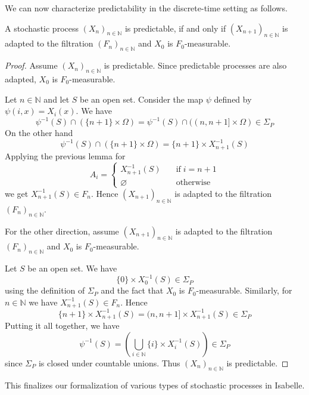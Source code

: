 We can now characterize predictability in the discrete-time setting as follows.
\begin{theorem}
	A stochastic process $(X_n)_{n \in \mathbb{N}}$ is predictable, if and only if $(X_{n + 1})_{n \in \mathbb{N}}$ is adapted to the filtration $(F_n)_{n \in \mathbb{N}}$ and $X_0$ is $F_0$-measurable.
\end{theorem}
\begin{proof}
	Assume $(X_n)_{n \in \mathbb{N}}$ is predictable. Since predictable processes are also adapted, $X_0$ is $F_0$-measurable.
	
	Let $n \in \mathbb{N}$ and let $S$ be an open set. Consider the map $\psi$ defined by $\psi(i,x) = X_i(x)$. We have
	\[
		\psi^{-1}(S) \cap (\{n + 1\} \times \Omega) = \psi^{-1}(S) \cap ((n, n + 1] \times \Omega) \in \Sigma_P
	\]
	On the other hand
	\[
		\psi^{-1}(S) \cap (\{n + 1\} \times \Omega) = \{n + 1\} \times X_{n + 1}^{-1}(S)
	\]
	Applying the previous lemma for 
	\[
		A_i = 
		\begin{cases}
			X_{n + 1}^{-1}(S) &\quad \textrm{if} \; i = n + 1 \\
			\varnothing &\quad \textrm{otherwise}
		\end{cases}
	\]
	we get $X_{n + 1}^{-1}(S) \in F_n$. Hence $(X_{n + 1})_{n \in \mathbb{N}}$ is adapted to the filtration $(F_n)_{n \in \mathbb{N}}$.
	
	For the other direction, assume $(X_{n + 1})_{n \in \mathbb{N}}$ is adapted to the filtration $(F_n)_{n \in \mathbb{N}}$ and $X_0$ is $F_0$-measurable.
	
	Let $S$ be an open set. We have
	\[
		\{0\} \times X_0^{-1}(S) \in \Sigma_P
	\]
	using the definition of $\Sigma_P$ and the fact that $X_0$ is $F_0$-measurable. Similarly, for $n \in \mathbb{N}$ we have $X_{n + 1}^{-1}(S) \in F_n$. Hence
	\[
		\{n + 1\} \times X_{n + 1}^{-1}(S) = (n, n + 1] \times X_{n + 1}^{-1}(S) \in \Sigma_P
	\]
	Putting it all together, we have
	\[
		\psi^{-1}(S) = \left(\bigcup_{i \in \mathbb{N}} \{i\} \times X_i^{-1}(S) \right) \in \Sigma_P
	\]
	since $\Sigma_P$ is closed under countable unions. Thus $(X_n)_{n \in \mathbb{N}}$ is predictable.
\end{proof}

This finalizes our formalization of various types of stochastic processes in Isabelle.
